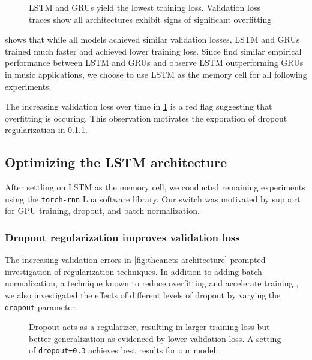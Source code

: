 \begin{figure}[tb]
    \centering
    
    \caption{LSTM and GRUs yield the lowest training loss. Validation loss
      traces show all architectures exhibit signs of significant overfitting}
    \label{fig:theanets-architecture}
\end{figure}

 shows that while all models achieved similar
validation losses, LSTM and GRUs trained much faster and achieved lower
training loss. Since \citet{zaremba2015empirical} find similar empirical
performance between LSTM and GRUs and \citet{Nayebi2015} observe LSTM
outperforming GRUs in music applications, we choose to use LSTM as the memory
cell for all following experiments.

The increasing validation loss over time in \cref{fig:theanets-architecture}
is a red flag suggesting that overfitting is occuring. This observation motivates
the exporation of dropout regularization in \cref{sec:lstm-dropout}.

\subsection{Optimizing the LSTM architecture}\label{sec:lstm-grid-search}

After settling on LSTM as the memory cell, we conducted remaining experiments
using the \texttt{torch-rnn} Lua software library. Our switch was motivated by
support for GPU training, dropout, and batch normalization.

\subsubsection{Dropout regularization improves validation loss}\label{sec:lstm-dropout}


The increasing validation errors in \vref{fig:theanets-architecture} prompted
investigation of regularization techniques. In addition to adding batch
normalization, a technique known to reduce overfitting and accelerate training
\cite{ioffe2015batch}, we also investigated the effects of different levels
of dropout by varying the \texttt{dropout} parameter.

\begin{figure}[tb]
  \centering
  
  \caption{Dropout acts as a regularizer, resulting in larger training loss
  but better generalization as evidenced by lower validation loss. A setting of
\texttt{dropout=0.3} achieves best results for our model.}
  \label{fig:torch-rnn-dropout}
\end{figure}

